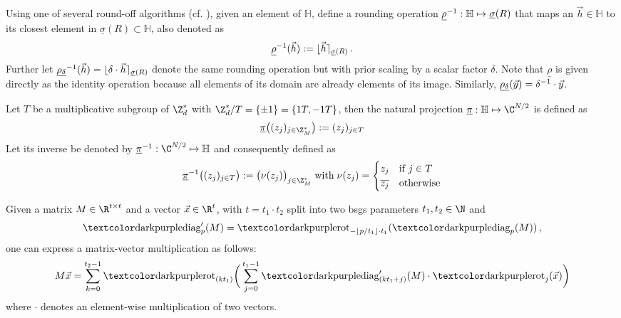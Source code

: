\begin{frame}[c]
  \begin{definition}
    Using one of several round-off algorithms (cf. \cite{2013-rlwe-toolkit}), given an element of $\mathbb{H}$, define a rounding operation $\underline{\rho}^{-1}: \mathbb{H} \mapsto \underline{\sigma}(R)$ that maps an $\vec{h} \in \mathbb{H}$ to its closest element in $\underline{\sigma}(R) \subset \mathbb{H}$, also denoted as
    $$\underline{\rho}^{-1}(\vec{h}) := \lfloor \vec{h} \rceil_{\underline{\sigma}(R)}\,.$$
    Further let $\underline{\rho_\delta}^{-1}(\vec{h}) = \lfloor \delta \cdot \vec{h} \rceil_{\underline{\sigma}(R)}$ denote the same rounding operation but with prior scaling by a scalar factor $\delta$.
    Note that $\underline{\rho}$ is given directly as the identity operation because all elements of its domain are already elements of its image. Similarly, $\underline{\rho_\delta}(\vec{y}) = \delta^{-1} \cdot \vec{y}$.
  \end{definition}
\end{frame}

\begin{frame}[c]
  \begin{definition}
    Let $T$ be a multiplicative subgroup of $\Z_d^*$ with $\Z_d^* / T = \{\pm 1\} = \{1T, -1T\}$, then the natural projection $\underline{\pi}: \mathbb{H} \mapsto \C^{N/2}$ is defined as
    $$\underline{\pi}\big((z_j)_{j \in \Z_M^*}\big) := (z_j)_{j \in T}$$
    Let its inverse be denoted by $\underline{\pi}\inv: \C^{N/2} \mapsto \mathbb{H}$ and consequently defined as
    $$\underline{\pi}\inv\big((z_j)_{j \in T}\big) := \big(\nu(z_j)\big)_{j \in \Z_M^*} \; \mathrm{with} \; \nu(z_j) = \begin{cases}
        z_j            & \text{if } j \in T \\
        \overline{z_j} & \text{otherwise}
      \end{cases}$$
  \end{definition}
\end{frame}

\begin{frame}[c]
  \begin{theorem}
    Given a matrix $M \in \R^{t \times t}$ and a vector $\vec{x} \in \R^t$, with $t = t_1 \cdot t_2$ split into two \gls{bsgs} parameters $t_1, t_2 \in \N$ and
    $$\diag'_p(M) = \rot_{-\lfloor p/t_1 \rfloor \cdot t_1}(\diag_p(M))\,,$$
    one can express a matrix-vector multiplication as follows:
    \begin{equation*}
      M \vec{x} = \sum_{k=0}^{t_2-1} \rot_{(kt_1)} \bigg(
      \sum_{j=0}^{t_1-1} \diag'_{(kt_1+j)}(M) \cdot \rot_j(\vec{x})
      \bigg)
    \end{equation*}
    where $\cdot$ denotes an element-wise multiplication of two vectors.
  \end{theorem}
\end{frame}


